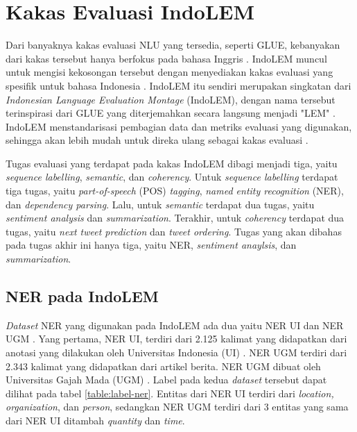 \section{Kakas Evaluasi IndoLEM}

Dari banyaknya kakas evaluasi NLU yang tersedia, seperti GLUE, kebanyakan dari kakas tersebut hanya berfokus pada bahasa Inggris \parencite{indolem}. IndoLEM muncul untuk mengisi kekosongan tersebut dengan menyediakan kakas evaluasi yang spesifik untuk bahasa Indonesia \parencite{indolem}. IndoLEM itu sendiri merupakan singkatan dari \textit{Indonesian Language Evaluation Montage} (IndoLEM), dengan nama tersebut terinspirasi dari GLUE yang diterjemahkan secara langsung menjadi "LEM" \parencite{indolem}. IndoLEM menstandarisasi pembagian data dan metriks evaluasi yang digunakan, sehingga akan lebih mudah untuk direka ulang sebagai kakas evaluasi \parencite{indolem}.

Tugas evaluasi yang terdapat pada kakas IndoLEM dibagi menjadi tiga, yaitu \textit{sequence labelling}, \textit{semantic}, dan \textit{coherency}. Untuk \textit{sequence labelling} terdapat tiga tugas, yaitu \textit{part-of-speech} (POS) \textit{tagging}, \textit{named entity recognition} (NER), dan \textit{dependency parsing}. Lalu, untuk \textit{semantic} terdapat dua tugas, yaitu \textit{sentiment analysis} dan \textit{summarization}. Terakhir, untuk \textit{coherency} terdapat dua tugas, yaitu \textit{next tweet prediction} dan \textit{tweet ordering}. Tugas yang akan dibahas pada tugas akhir ini hanya tiga, yaitu NER, \textit{sentiment anaylsis}, dan \textit{summarization}.

\subsection{NER pada IndoLEM}

\textit{Dataset} NER yang digunakan pada IndoLEM ada dua yaitu NER UI dan NER UGM \parencite{indolem}. Yang pertama, NER UI, terdiri dari 2.125 kalimat yang didapatkan dari anotasi yang dilakukan oleh Universitas Indonesia (UI) \parencite{indolem}. NER UGM terdiri dari 2.343 kalimat yang didapatkan dari artikel berita. NER UGM dibuat oleh Universitas Gajah Mada (UGM) \parencite{indolem}. Label pada kedua \textit{dataset} tersebut dapat dilihat pada tabel \ref{table:label-ner}. Entitas dari NER UI terdiri dari \textit{location, organization}, dan \textit{person}, sedangkan NER UGM terdiri dari 3 entitas yang sama dari NER UI ditambah \textit{quantity} dan \textit{time}.

